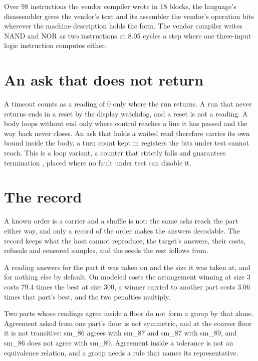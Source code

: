 Over 98 instructions the vendor compiler wrote in 18 blocks, the language's disassembler gives
the vendor's text and its assembler the vendor's operation bits wherever the machine description
holds the form. The vendor compiler writes NAND and NOR as two instructions at 8.05 cycles a step
where one three-input logic instruction computes either.

\section{An ask that does not return}

A timeout counts as a reading of 0 only where the run returns. A run that never returns ends in a
reset by the display watchdog, and a reset is not a reading. A body loops without end only where
control reaches a line it has passed and the way back never closes. An ask that holds a waited
read therefore carries its own bound inside the body, a turn count kept in registers the bits
under test cannot reach. This is a loop variant, a counter that strictly falls and guarantees
termination \cite{src:Floyd}, placed where no fault under test can disable it.

\section{The record}

A known order is a carrier and a shuffle is not: the same asks reach the part either way, and
only a record of the order makes the answers decodable. The record keeps what the host cannot
reproduce, the target's answers, their costs, refusals and censored samples, and the seeds the
rest follows from.

A reading answers for the part it was taken on and the size it was taken at, and for nothing else
by default. On modeled costs the arrangement winning at size 3 costs 79.4 times the best at size
300, a winner carried to another part costs 3.06 times that part's best, and the two penalties
multiply.

Two parts whose readings agree inside a floor do not form a group by that alone. Agreement asked
from one part's floor is not symmetric, and at the coarser floor it is not transitive: sm\_86
agrees with sm\_87 and sm\_87 with sm\_89, and sm\_86 does not agree with sm\_89. Agreement inside
a tolerance is not an equivalence relation, and a group needs a rule that names its
representative.
